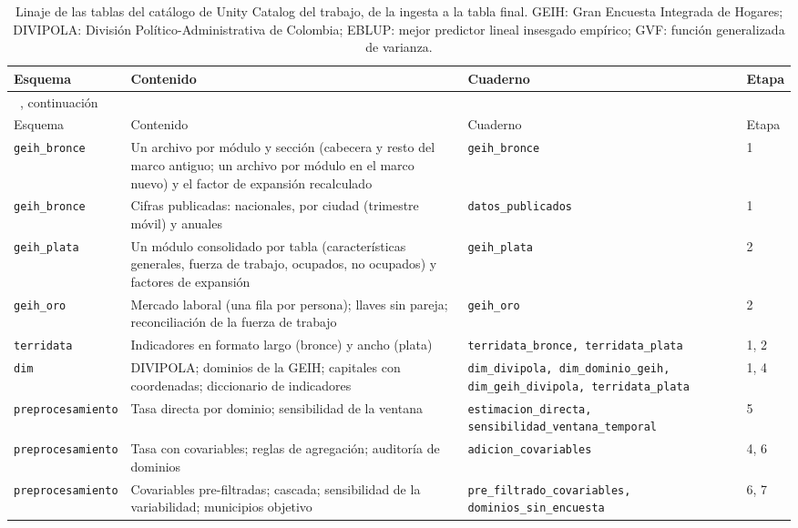 {\footnotesize\setlength{\tabcolsep}{3pt}
\begin{longtable}{p{2.8cm} p{3.6cm} p{4.8cm} p{1.2cm}}
\caption[Linaje de las tablas del procesamiento]{Linaje de las tablas del catálogo de Unity Catalog del trabajo, de la ingesta a la tabla final. GEIH: Gran Encuesta Integrada de Hogares; DIVIPOLA: División Político-Administrativa de Colombia; EBLUP: mejor predictor lineal insesgado empírico; GVF: función generalizada de varianza.}
\label{tab:app_linaje} \\
\toprule
Esquema & Contenido & Cuaderno & Etapa \\
\midrule
\endfirsthead
\multicolumn{4}{l}{\tablename~\thetable{}, continuación} \\
\toprule
Esquema & Contenido & Cuaderno & Etapa \\
\midrule
\endhead
\bottomrule
\endlastfoot
\texttt{geih\_bronce} & Un archivo por módulo y sección (cabecera y resto del marco antiguo; un archivo por módulo en el marco nuevo) y el factor de expansión recalculado & \texttt{geih\_bronce} & 1 \\
\texttt{geih\_bronce} & Cifras publicadas: nacionales, por ciudad (trimestre móvil) y anuales & \texttt{datos\_publicados} & 1 \\
\texttt{geih\_plata} & Un módulo consolidado por tabla (características generales, fuerza de trabajo, ocupados, no ocupados) y factores de expansión & \texttt{geih\_plata} & 2 \\
\texttt{geih\_oro} & Mercado laboral (una fila por persona); llaves sin pareja; reconciliación de la fuerza de trabajo & \texttt{geih\_oro} & 2 \\
\texttt{terridata} & Indicadores en formato largo (bronce) y ancho (plata) & \texttt{terridata\_bronce, terridata\_plata} & 1, 2 \\
\texttt{dim} & DIVIPOLA; dominios de la GEIH; capitales con coordenadas; diccionario de indicadores & \texttt{dim\_divipola, dim\_dominio\_geih, dim\_geih\_divipola, terridata\_plata} & 1, 4 \\
\texttt{preprocesamiento} & Tasa directa por dominio; sensibilidad de la ventana & \texttt{estimacion\_directa, sensibilidad\_ventana\_temporal} & 5 \\
\texttt{preprocesamiento} & Tasa con covariables; reglas de agregación; auditoría de dominios & \texttt{adicion\_covariables} & 4, 6 \\
\texttt{preprocesamiento} & Covariables pre-filtradas; cascada; sensibilidad de la variabilidad; municipios objetivo & \texttt{pre\_filtrado\_covariables, dominios\_sin\_encuesta} & 6, 7 \\

\end{longtable}}
